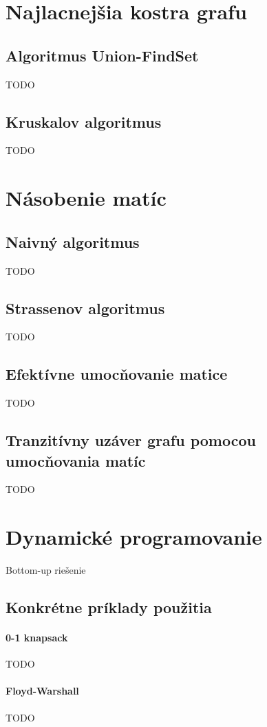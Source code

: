 \section{Najlacnejšia kostra grafu}

	\subsection{Algoritmus Union-FindSet} TODO

	\subsection{Kruskalov algoritmus} TODO

\section{Násobenie matíc}

	\subsection{Naivný algoritmus} TODO
	\subsection{Strassenov algoritmus} TODO
	\subsection{Efektívne umocňovanie matice} TODO
	\subsection{Tranzitívny uzáver grafu pomocou umocňovania matíc} TODO


\section{Dynamické programovanie}
	Bottom-up riešenie
	\subsection{Konkrétne príklady použitia} 
		\paragraph{0-1 knapsack} TODO
		\paragraph{Floyd-Warshall} TODO
